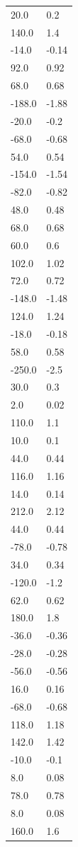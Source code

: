 \begin{longtable}{ll}
20.0 & 0.2 \\
140.0 & 1.4 \\
-14.0 & -0.14 \\
92.0 & 0.92 \\
68.0 & 0.68 \\
-188.0 & -1.88 \\
-20.0 & -0.2 \\
-68.0 & -0.68 \\
54.0 & 0.54 \\
-154.0 & -1.54 \\
-82.0 & -0.82 \\
48.0 & 0.48 \\
68.0 & 0.68 \\
60.0 & 0.6 \\
102.0 & 1.02 \\
72.0 & 0.72 \\
-148.0 & -1.48 \\
124.0 & 1.24 \\
-18.0 & -0.18 \\
58.0 & 0.58 \\
-250.0 & -2.5 \\
30.0 & 0.3 \\
2.0 & 0.02 \\
110.0 & 1.1 \\
10.0 & 0.1 \\
44.0 & 0.44 \\
116.0 & 1.16 \\
14.0 & 0.14 \\
212.0 & 2.12 \\
44.0 & 0.44 \\
-78.0 & -0.78 \\
34.0 & 0.34 \\
-120.0 & -1.2 \\
62.0 & 0.62 \\
180.0 & 1.8 \\
-36.0 & -0.36 \\
-28.0 & -0.28 \\
-56.0 & -0.56 \\
16.0 & 0.16 \\
-68.0 & -0.68 \\
118.0 & 1.18 \\
142.0 & 1.42 \\
-10.0 & -0.1 \\
8.0 & 0.08 \\
78.0 & 0.78 \\
8.0 & 0.08 \\
160.0 & 1.6 \\

\end{longtable}
